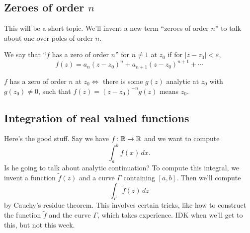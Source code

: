 \subsection{Zeroes of order $n$}
This will be a short topic. We'll invent a new term ``zeroes of order $n$'' to talk about one over poles of order $n$.
\begin{definition}[]
    We say that ``$f$ has a zero of order $n$'' for $n\neq 1$ at $z_0$ if for $|z-z_0|<\varepsilon $, \[
        f(z)=a_n (z-z_0)^n +a_{n+1}(z-z_0)^{n+1}+\cdots 
    \] 
\end{definition}
\begin{lemma}
    $f$ has a zero of order $n$ at $z_0\iff$ there is some $g(z)$ analytic at $ z_0$ with $g(z_0)\neq 0$, such that $f(z)=(z-z_0)^{-n}g(z)$ means $z_0$.
\end{lemma}
\subsection{Integration of real valued functions}
Here's the good stuff. Say we have $f\colon \mathbb{R} \to \mathbb{R}$ and we want to compute \[
    \int_{a}^{b} f(x) \, dx.
\] Is he going to talk about analytic continuation? To compute this integral, we invent a function $\widetilde f(z)$ and a curve $\Gamma $ containing $[a,b]$. Then we'll compute \[
\int_{\Gamma }^{} \widetilde f(z) \, dz
\] by Cauchy's residue theorem. This involves certain tricks, like how to construct the function $\widetilde f$ and the curve $\Gamma $, which takes experience. IDK when we'll get to this, but not this week. 
